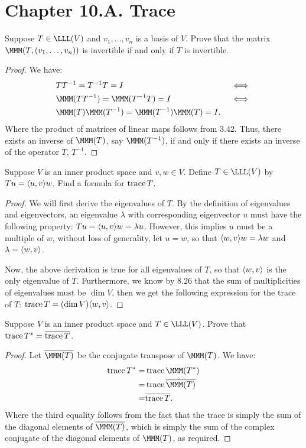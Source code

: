 \section*{Chapter 10.A. Trace}


\begin{exercise}{1}
  Suppose $T\in\LLL(V)$ and $v_1,\dots,v_n$ is a basis of $V$. Prove that the matrix $\MMM(T, (v_1,\dots,v_n))$ is invertible if and only if $T$ is invertible.
\end{exercise}
\begin{proof}
 We have:
 \begin{align*}
     &TT^{-1}=T^{-1}T=I &&\iff\\
     &\MMM(TT^{-1})=\MMM(T^{-1}T)=I &&\iff\\
     &\MMM(T)\MMM(T^{-1})=\MMM(T^{-1})\MMM(T)=I.&&
 \end{align*}
 Where the product of matrices of linear maps follows from 3.42. Thus, there exists an inverse of $\MMM(T)$, say $\MMM(T^{-1})$, if and only if there exists an inverse of the operator $T$, $T^{-1}$.
\end{proof}

\begin{exercise}{8}
  Suppose $V$ is an inner product space and $v,w\in V$. Define $T\in\LLL(V)$ by $Tu=\langle u,v\rangle w$. Find a formula for $\operatorname*{trace} T$.
\end{exercise}
\begin{proof}
 We will first derive the eigenvalues of $T$. By the definition of eigenvalues and eigenvectors, an eigenvalue $\lambda$ with corresponding eigenvector $u$ must have the following property: $Tu =\langle u,v\rangle w =\lambda u$. However, this implies $u$ must be a multiple of $w$, without loss of generality, let $u=w$, so that $\langle w,v\rangle w=\lambda w$ and $\lambda=\langle w,v\rangle$. 
 
 Now, the above derivation is true for all eigenvalues of $T$, so that $\langle w,v\rangle$ is the only eigenvalue of $T$. Furthermore, we know by 8.26 that the sum of multiplicities of eigenvalues must be $\dim V$, then we get the following expression for the trace of $T$: $\operatorname*{trace} T=(\dim V)\langle w,v\rangle$.
\end{proof}

\begin{exercise}{10}
  Suppose $V$ is an inner product space and $T\in\LLL(V)$. Prove that $\operatorname*{trace} T^\ast =\overline{\operatorname*{trace} T}$.
\end{exercise}
\begin{proof}
 Let $\overline{\MMM(T)}$ be the conjugate transpose of $\MMM(T)$. We have:
 \begin{align*}
     \trace T^\ast =& \trace\MMM(T^\ast)\\
     =& \trace\overline{\MMM(T)}\\
     =& \overline{\trace T}.
 \end{align*}
 Where the third equality follows from the fact that the trace is simply the sum of the diagonal elements of $\overline{\MMM(T)}$, which is simply the sum of the complex conjugate of the diagonal elements of $\MMM(T)$, as required.
\end{proof}


